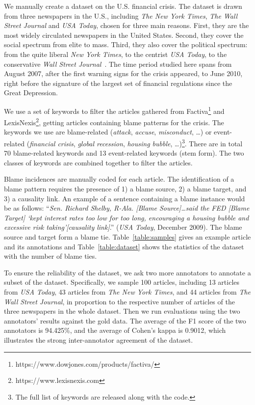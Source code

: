 \documentclass[letterpaper]{article} %
\begin{document}
We manually create a dataset on the U.S. financial crisis. The dataset is drawn from three newspapers in the U.S., including {\it The New York Times}, {\it The Wall Street Journal} and {\it USA Today}, chosen for three main reasons. First, they are the most widely circulated newspapers in the United States. Second, they cover the social spectrum from elite to mass. Third, they also cover the political spectrum: from the quite liberal {\it New York Times}, to the centrist {\it USA Today}, to the conservative {\it Wall Street Journal}~\cite{gentzkow2010drives,groseclose2005measure}. The time period studied here spans from August 2007, after the first warning signs for the crisis appeared, to June 2010, right before the signature of the largest set of financial regulations since the Great Depression.

We use a set of keywords to filter the articles gathered from Factiva\footnote{https://www.dowjones.com/products/factiva/} and LexisNexis\footnote{https://www.lexisnexis.com}, getting articles containing blame patterns for the crisis. The keywords we use are blame-related ({\it attack}, {\it accuse}, {\it misconduct}, \ldots) or event-related ({\it financial crisis}, {\it global recession}, {\it housing bubble}, \ldots)\footnote{The full list of keywords are released along with the code.}. There are in total 70 blame-related keywords and 13 event-related keywords (stem form). The two classes of keywords are combined together to filter the articles.

Blame incidences are manually coded for each article. The identification of a blame pattern requires the presence of 1) a blame source, 2) a blame target, and 3) a causality link. An example of a sentence containing a blame instance would be as follows: ``{\it Sen. Richard Shelby, R-Ala. [Blame Source]\ldots said the FED [Blame Target] `kept interest rates too low for too long, encouraging a housing bubble and excessive risk taking'[causality link]}.'' ({\it USA Today}, December 2009). The blame source and target form a blame tie. Table~\ref{table:samples} gives an example article and its annotations and Table~\ref{table:dataset} shows the statistics of the dataset with the number of blame ties.

To ensure the reliability of the dataset, we ask two more annotators to annotate a subset of the dataset. Specifically, we sample 100 articles, including 13 articles from {\it USA Today}, 43 articles from {\it The New York Times}, and 44 articles from {\it The Wall Street Journal}, in proportion to the respective number of articles of the three newspapers in the whole dataset. Then we run evaluations using the two annotators' results against the gold data. The average of the F1 score of the two annotators is 94.425\%, and the average of Cohen's kappa is 0.9012, which illustrates the strong inter-annotator agreement of the dataset.
\end{document}
